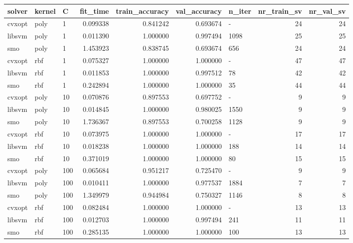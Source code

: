 \begin{tabular}{lllrrrlrr}
\toprule
solver & kernel &   C &  fit\_time &  train\_accuracy &  val\_accuracy & n\_iter &  nr\_train\_sv &  nr\_val\_sv \\
\midrule
cvxopt &   poly &   1 &  0.099338 &        0.841242 &      0.693674 &      - &           24 &         24 \\
libsvm &   poly &   1 &  0.011390 &        1.000000 &      0.997494 &   1098 &           25 &         25 \\
   smo &   poly &   1 &  1.453923 &        0.838745 &      0.693674 &    656 &           24 &         24 \\
cvxopt &    rbf &   1 &  0.075327 &        1.000000 &      1.000000 &      - &           47 &         47 \\
libsvm &    rbf &   1 &  0.011853 &        1.000000 &      0.997512 &     78 &           42 &         42 \\
   smo &    rbf &   1 &  0.242894 &        1.000000 &      1.000000 &     35 &           44 &         44 \\
cvxopt &   poly &  10 &  0.070876 &        0.897553 &      0.697752 &      - &            9 &          9 \\
libsvm &   poly &  10 &  0.014845 &        1.000000 &      0.980025 &   1550 &            9 &          9 \\
   smo &   poly &  10 &  1.736367 &        0.897553 &      0.700258 &   1128 &            9 &          9 \\
cvxopt &    rbf &  10 &  0.073975 &        1.000000 &      1.000000 &      - &           17 &         17 \\
libsvm &    rbf &  10 &  0.018238 &        1.000000 &      1.000000 &    188 &           14 &         14 \\
   smo &    rbf &  10 &  0.371019 &        1.000000 &      1.000000 &     80 &           15 &         15 \\
cvxopt &   poly & 100 &  0.065684 &        0.951217 &      0.725470 &      - &            9 &          9 \\
libsvm &   poly & 100 &  0.010411 &        1.000000 &      0.977537 &   1884 &            7 &          7 \\
   smo &   poly & 100 &  1.349979 &        0.944984 &      0.750327 &   1146 &            8 &          8 \\
cvxopt &    rbf & 100 &  0.082484 &        1.000000 &      1.000000 &      - &           13 &         13 \\
libsvm &    rbf & 100 &  0.012703 &        1.000000 &      0.997494 &    241 &           11 &         11 \\
   smo &    rbf & 100 &  0.285135 &        1.000000 &      1.000000 &    100 &           13 &         13 \\
\bottomrule
\end{tabular}
